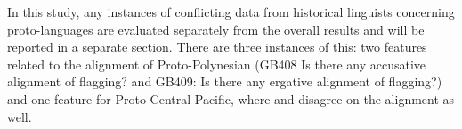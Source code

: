 \documentclass[12pt,letterpaper]{article}
\begin{document}
In this study, any instances of conflicting data from historical linguists concerning proto-languages are evaluated separately from the overall results and will be reported in a separate section. There are three instances of this: two features related to the alignment of Proto-Polynesian (GB408 Is there any accusative alignment of flagging? and GB409: Is there any ergative alignment of flagging?) and one feature for Proto-Central Pacific, where \citet{kikusawa2002proto} and \citet{ball2007ergativity} disagree on the alignment as well.



\end{document}
